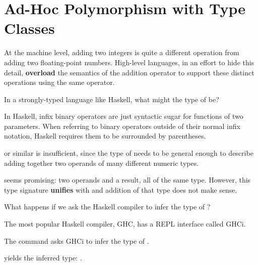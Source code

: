 \section{Ad-Hoc Polymorphism with Type Classes}

\begin{notelist}
    \item At the machine level, adding two integers is quite a different operation from
          adding two floating-point numbers. High-level languages, in an effort to hide
          this detail, \textbf{overload} the semantics of the addition operator to support 
          these distinct operations using the same operator. 

    \item In a strongly-typed language like Haskell, what might the type of \code{(+)} be?
    \begin{notelist}
        \item In Haskell, infix binary operators are just syntactic sugar for functions
              of two parameters. When referring to binary operators outside of their
              normal infix notation, Haskell requires them to be surrounded by parentheses.
    \end{notelist}

    \item {} or similar is insufficient, since the type of \code{(+)}
          needs to be general enough to describe adding together two operands
          of many different numeric types.

    \item {} seems promising: two operands and a result, all of the same type. However,
          this type signature \textbf{unifies} with 
          and addition of that type does not make sense.

    \item What happens if we ask the Haskell compiler to infer the type of \code{(+)}?
    \begin{notelist}
        \item The most popular Haskell compiler, GHC, has a REPL interface called GHCi.
        \item The command  asks GHCi to infer the type of
              .
        \item {} yields the inferred type: .
    \end{notelist}


\end{notelist}
